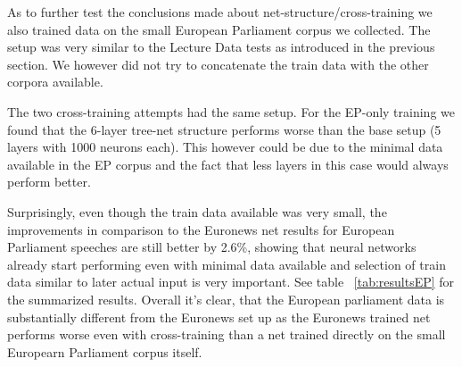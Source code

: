 As to further test the conclusions made about net-structure/cross-training we also trained data on the small European Parliament corpus we collected. The setup was very similar to the Lecture Data tests as introduced in the previous section.  We however did not try to concatenate the train data with the other corpora available.

The two cross-training attempts had the same setup. For the EP-only training we found that the 6-layer tree-net structure performs worse than the base setup (5 layers with 1000 neurons each). This however could be due to the minimal data available in the EP corpus and the fact that less layers in this case would always perform better.

Surprisingly, even though the train data available was very small, the improvements in comparison to the Euronews net results for European Parliament speeches are still better by 2.6\%, showing that neural networks already start performing even with minimal data available and selection of train data similar to later actual input is very important. See table ~\ref{tab:resultsEP} for the summarized results. Overall it's clear, that the European parliament data is substantially different from the Euronews set up as the Euronews trained net performs worse even with cross-training than a net trained directly on the small Europearn Parliament corpus itself.


